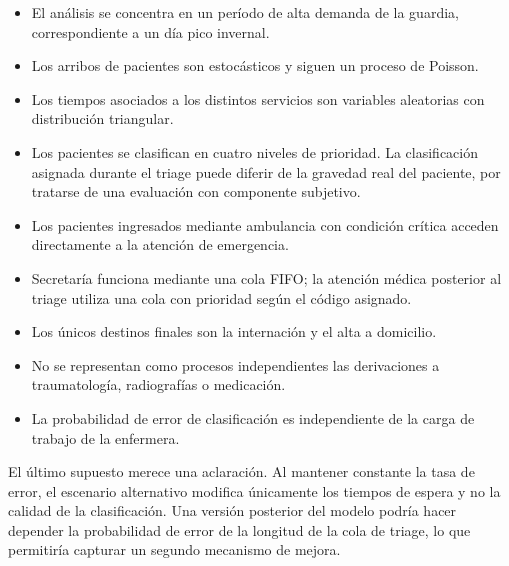 \begin{itemize}
  \item El análisis se concentra en un período de alta demanda de la guardia,
  correspondiente a un día pico invernal.
  \item Los arribos de pacientes son estocásticos y siguen un proceso de
  Poisson.
  \item Los tiempos asociados a los distintos servicios son variables
  aleatorias con distribución triangular.
  \item Los pacientes se clasifican en cuatro niveles de prioridad. La
  clasificación asignada durante el triage puede diferir de la gravedad real
  del paciente, por tratarse de una evaluación con componente subjetivo.
  \item Los pacientes ingresados mediante ambulancia con condición crítica
  acceden directamente a la atención de emergencia.
  \item Secretaría funciona mediante una cola FIFO; la atención médica
  posterior al triage utiliza una cola con prioridad según el código asignado.
  \item Los únicos destinos finales son la internación y el alta a domicilio.
  \item No se representan como procesos independientes las derivaciones a
  traumatología, radiografías o medicación.
  \item La probabilidad de error de clasificación es independiente de la carga
  de trabajo de la enfermera.
\end{itemize}

El último supuesto merece una aclaración. Al mantener constante la tasa de
error, el escenario alternativo modifica únicamente los tiempos de espera y
no la calidad de la clasificación. Una versión posterior del modelo podría
hacer depender la probabilidad de error de la longitud de la cola de triage,
lo que permitiría capturar un segundo mecanismo de mejora.

